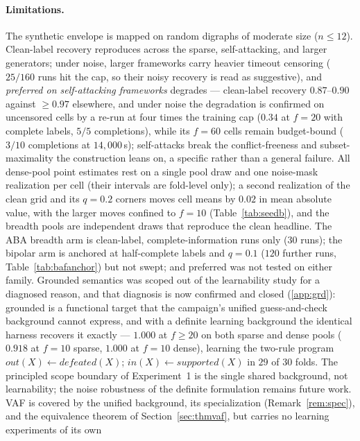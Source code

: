 \documentclass[review,12pt]{elsarticle}
\theoremstyle{definition}
\theoremstyle{remark}
\begin{document}
\paragraph{Limitations.} The synthetic envelope is mapped on random digraphs of
moderate size ($n\le12$). Clean-label recovery reproduces across the sparse,
self-attacking, and larger generators; under noise, larger frameworks carry
heavier timeout censoring ($25/160$ runs hit the cap, so their noisy recovery is
read as suggestive), and \emph{preferred on self-attacking frameworks} degrades
--- clean-label recovery $0.87$--$0.90$ against $\ge0.97$ elsewhere, and
under noise the degradation is confirmed on uncensored cells by a re-run at
four times the training cap ($0.34$ at $f{=}20$ with complete labels, $5/5$
completions), while its $f{=}60$ cells remain budget-bound ($3/10$
completions at $14{,}000$\,s); self-attacks break the conflict-freeness
and subset-maximality the construction leans on, a specific rather than a
general failure. All dense-pool point estimates rest on a single pool draw and
one noise-mask realization per cell (their intervals are fold-level only); a
second realization of the clean grid and its $q{=}0.2$ corners moves cell
means by $0.02$ in mean absolute value, with the larger moves confined to
$f{=}10$ (Table~\ref{tab:seedb}), and the breadth pools are independent draws
that reproduce the clean headline. The ABA breadth arm is clean-label,
complete-information runs only ($30$ runs); the bipolar arm is anchored at
half-complete labels and $q{=}0.1$ ($120$ further runs, Table~\ref{tab:bafanchor})
but not swept; and preferred was not tested on either family. Grounded semantics was
scoped out of the learnability study for a diagnosed reason, and that
diagnosis is now confirmed and closed (\ref{app:grd}): grounded is a
functional target that the campaign's unified guess-and-check background
cannot express, and with a definite learning background the identical harness
recovers it exactly --- $1.000$ at $f\ge20$ on both sparse and dense pools
($0.918$ at $f{=}10$ sparse, $1.000$ at $f{=}10$ dense), learning the
two-rule program $\mathit{out}(X)\leftarrow\mathit{defeated}(X)$;
$\mathit{in}(X)\leftarrow\mathit{supported}(X)$ in $29$ of $30$ folds. The
principled scope boundary of Experiment~1 is the single shared background,
not learnability; the noise robustness of the definite formulation remains
future work. VAF is covered by the unified background, its
specialization (Remark~\ref{rem:spec}), and the equivalence theorem of
Section~\ref{sec:thmvaf}, but carries no learning experiments of its own
\end{document}
